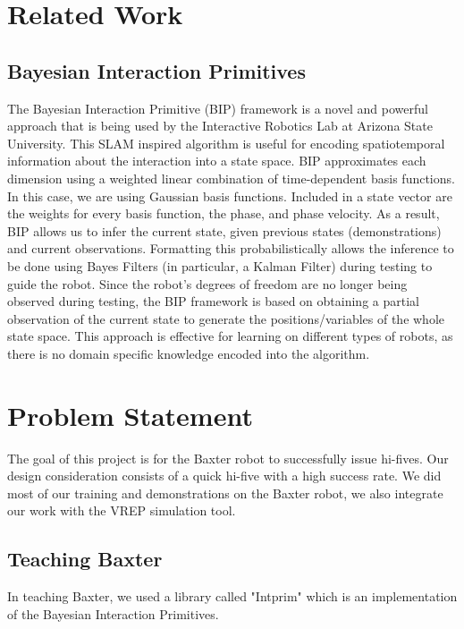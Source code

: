 \documentclass[letterpaper, 10 pt, conference]{ieeeconf}  %
\begin{document}
\section{Related Work}

\subsection{Bayesian Interaction Primitives}
The Bayesian Interaction Primitive (BIP) framework is a novel and powerful approach that is being used by the Interactive Robotics Lab at Arizona State University. This SLAM inspired algorithm is useful for encoding spatiotemporal information about the interaction into a state space. BIP approximates each dimension using a weighted linear combination of time-dependent basis functions. In this case, we are using Gaussian basis functions. Included in a state vector are the weights for every basis function, the phase, and phase velocity. As a result, BIP allows us to infer the current state, given previous states (demonstrations) and current observations. Formatting this probabilistically allows the inference to be done using Bayes Filters (in particular, a Kalman Filter) during testing to guide the robot. Since the robot's degrees of freedom are no longer being observed during testing, the BIP framework is based on obtaining a partial observation of the current state to generate the positions/variables of the whole state space. This approach is effective for learning on different types of robots, as there is no domain specific knowledge encoded into the algorithm.

\section{Problem Statement}
The goal of this project is for the Baxter robot to successfully issue hi-fives. Our design consideration consists of a quick hi-five with a high success rate. We did most of our training and demonstrations on the Baxter robot, we also integrate our work with the VREP simulation tool.

\subsection{Teaching Baxter}
In teaching Baxter, we used a library called "Intprim" which is an implementation of the Bayesian Interaction Primitives. 
\end{document}
